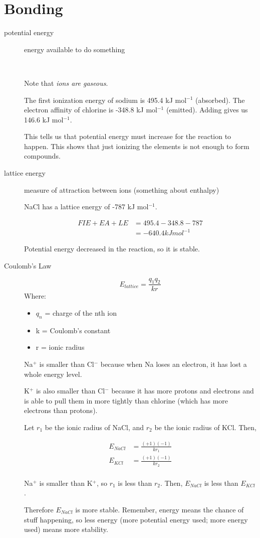 \documentclass[a4paper, 8pt]{memoir}
\begin{document}
\chapter{Bonding}
\begin{description}
\item[potential energy] energy available to do something

 \\

Note that \emph{ions are gaseous}.

The first ionization energy of sodium is 495.4 kJ mol$^{-1}$ (absorbed). The electron affinity of chlorine is -348.8 kJ mol$^{-1}$ (emitted). Adding gives us 146.6 kJ mol$^{-1}$.

This tells us that potential energy must increase for the reaction to happen. This shows that just ionizing the elements is not enough to form compounds.

\item[lattice energy] measure of attraction between ions (something about enthalpy)

NaCl has a lattice energy of -787 kJ mol$^{-1}$.

\begin{align*}
FIE + EA + LE &= 495.4 - 348.8 - 787 \\
&= -640.4 kJ mol^{-1}
\end{align*}

Potential energy decreased in the reaction, so it is stable.

\item[Coulomb's Law] \begin{equation}
E_{lattice} = \frac{q_1 q_2}{k r}
\end{equation}
Where:
\begin{itemize}
\item $q_n$ = charge of the nth ion
\item k = Coulomb's constant
\item r = ionic radius
\end{itemize}

Na$^+$ is smaller than Cl$^-$ because when Na loses an electron, it has lost a whole energy level.

K$^+$ is also smaller than Cl$^-$ because it has more protons and electrons and is able to pull them in more tightly than chlorine (which has more electrons than protons).

Let $r_1$ be the ionic radius of NaCl, and $r_2$ be the ionic radius of KCl. Then,

\begin{align*}
E_{NaCl} &= \frac{(+1)(-1)}{kr_1} \\
E_{KCl} &= \frac{(+1)(-1)}{kr_2} \\
\end{align*}

Na$^+$ is smaller than K$^+$, so $r_1$ is less than $r_2$. Then, $E_{NaCl}$ is less than $E_{KCl}$.

Therefore $E_{NaCl}$ is more stable. Remember, energy means the chance of stuff happening, so less energy (more potential energy used; more energy used) means more stability.
\end{description}
\end{document}
